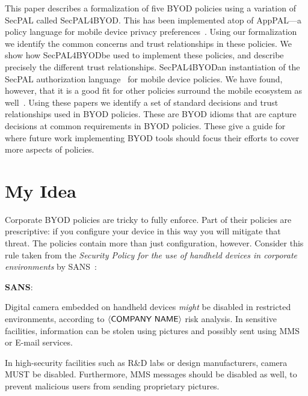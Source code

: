 \documentclass{llncs}
\newcommand{\AppPAL}[0]{SecPAL4BYOD}
\newenvironment{policyrule}[1]{%
  \begin{mdframed}\footnotesize
      \noindent\textbf{\sffamily #1}:~\itshape%
}{%
  \end{mdframed}
}
\begin{document}
This paper describes a formalization of five BYOD policies using a variation of SecPAL called \AppPAL.
This has been implemented atop of AppPAL---a policy language for mobile device privacy preferences~\cite{hallett_apppal_2016}.
Using our formalization we identify the common concerns and trust relationships in these policies.
We show how \AppPAL\AppPALcan be used to implement these policies, and describe precisely the different trust relationships.
\AppPAL\AppPALis an instantiation of the SecPAL authorization language~\cite{becker_secpal:_2010} for mobile device policies.
We have found, however, that it is a good fit for other policies surround the mobile ecosystem as well~\cite{hallett_specifying_2016}.
Using these papers we identify a set of standard decisions and trust relationships used in BYOD policies.
These are BYOD idioms that are capture decisions at common requirements in BYOD policies.
These give a guide for where future work implementing BYOD tools should focus their efforts to cover more aspects of policies.

\section{My Idea}
\label{sec:idea}

Corporate BYOD policies are tricky to fully enforce.
Part of their policies are prescriptive:  if you configure your device in this way you will mitigate that threat.
The policies contain more than just configuration, however.
Consider this rule taken from the \emph{Security Policy for the use of handheld devices in corporate environments} by SANS~\cite{nicholas_r._c._guerin_security_2008}:

\newcommand{\textbra}[1]{\ensuremath{\left\langle \text{\sffamily #1} \right\rangle}}
\begin{policyrule}{SANS}
  Digital camera embedded on handheld devices \emph{might} be disabled in restricted environments, according to \textbra{COMPANY NAME} risk analysis.
  In sensitive facilities, information can be stolen using pictures and possibly sent using MMS or E-mail services.

  In high-security facilities such as R\&D labs or design manufacturers, camera MUST be disabled.
  Furthermore, MMS messages should be disabled as well, to prevent malicious users from sending proprietary pictures.
\end{policyrule}
\end{document}

